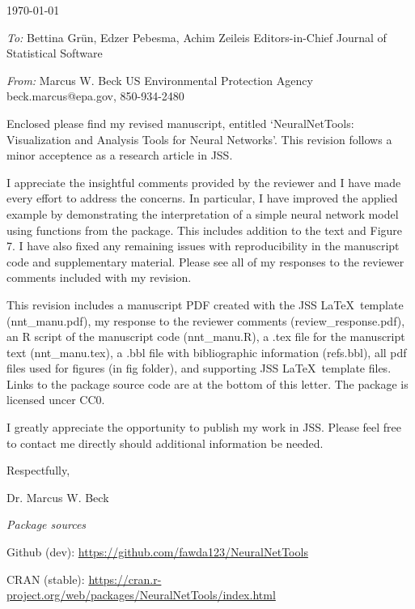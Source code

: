 \documentclass[a4paper,12pt]{article}
\begin{document}
\renewcommand{\rmdefault}{ptm}
\pagestyle{empty} 
\small

\setlength{\parindent}{0mm} 
\setlength{\parskip}{5mm}

\begin{flushright}
\today
\end{flushright}

\vfill
\emph{To:}\newline
Bettina Gr\"un, Edzer Pebesma, Achim Zeileis\newline
Editors-in-Chief\newline
Journal of Statistical Software

\emph{From:}\newline
Marcus W. Beck\newline
US Environmental Protection Agency\newline
beck.marcus@epa.gov, 850-934-2480\vspace{0.1in}

Enclosed please find my revised manuscript, entitled `NeuralNetTools: Visualization and Analysis Tools for Neural Networks'.  This revision follows a minor acceptence as a research article in JSS. 

I appreciate the insightful comments provided by the reviewer and I have made every effort to address the concerns.  In particular, I have improved the applied example by demonstrating the interpretation of a simple neural network model using functions from the package. This includes addition to the text and Figure 7.  I have also fixed any remaining issues with reproducibility in the manuscript code and supplementary material.  Please see all of my responses to the reviewer comments included with my revision.    

This revision includes a manuscript PDF created with the JSS \LaTeX\ template (nnt\_manu.pdf), my response to the reviewer comments (review\_response.pdf), an R script of the manuscript code (nnt\_manu.R), a .tex file for the manuscript text (nnt\_manu.tex), a .bbl file with bibliographic information (refs.bbl), all pdf files used for figures (in fig folder), and supporting JSS \LaTeX\ template files.  Links to the package source code are at the bottom of this letter. The package is licensed uncer CC0.   

I greatly appreciate the opportunity to publish my work in JSS.  Please feel free to contact me directly should additional information be needed.

\vspace{0.1in}

\hspace{4.5in}Respectfully,

\hspace{4.5in}Dr. Marcus W. Beck

{\it Package sources}

Github (dev): \url{https://github.com/fawda123/NeuralNetTools}

CRAN (stable): \url{https://cran.r-project.org/web/packages/NeuralNetTools/index.html}

\vfill
\end{document}
